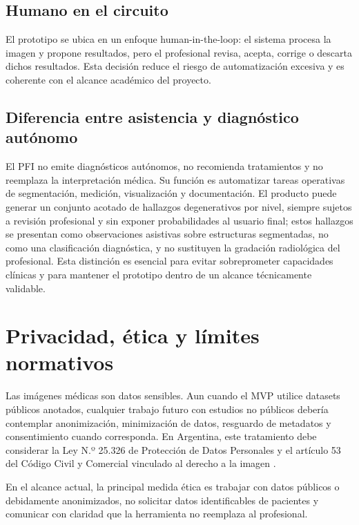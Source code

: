 \subsection{Humano en el circuito}

El prototipo se ubica en un enfoque human-in-the-loop: el sistema procesa la imagen y propone resultados, pero el profesional revisa, acepta, corrige o descarta dichos resultados. Esta decisión reduce el riesgo de automatización excesiva y es coherente con el alcance académico del proyecto.

\subsection{Diferencia entre asistencia y diagnóstico autónomo}

El PFI no emite diagnósticos autónomos, no recomienda tratamientos y no reemplaza la interpretación médica. Su función es automatizar tareas operativas de segmentación, medición, visualización y documentación. El producto puede generar un conjunto acotado de hallazgos degenerativos por nivel, siempre sujetos a revisión profesional y sin exponer probabilidades al usuario final; estos hallazgos se presentan como observaciones asistivas sobre estructuras segmentadas, no como una clasificación diagnóstica, y no sustituyen la gradación radiológica del profesional. Esta distinción es esencial para evitar sobreprometer capacidades clínicas y para mantener el prototipo dentro de un alcance técnicamente validable.

\section{Privacidad, ética y límites normativos}

Las imágenes médicas son datos sensibles. Aun cuando el MVP utilice datasets públicos anotados, cualquier trabajo futuro con estudios no públicos debería contemplar anonimización, minimización de datos, resguardo de metadatos y consentimiento cuando corresponda. En Argentina, este tratamiento debe considerar la Ley N.º 25.326 de Protección de Datos Personales y el artículo 53 del Código Civil y Comercial vinculado al derecho a la imagen \parencite{argentina_ley_25326,argentina_codigo_civil_imagen}.

En el alcance actual, la principal medida ética es trabajar con datos públicos o debidamente anonimizados, no solicitar datos identificables de pacientes y comunicar con claridad que la herramienta no reemplaza al profesional.

